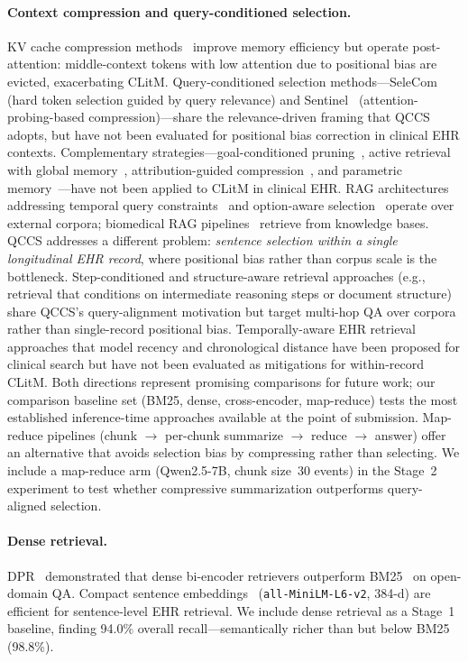 \documentclass{article}
\begin{document}
\paragraph{Context compression and query-conditioned selection.}
KV cache compression methods~\cite{zhang2023h2o,li2024snapkv,pan2024llmlingua2,%
bui2025cachewhat,zhou2024dynamickv} improve memory efficiency but operate
post-attention: middle-context tokens with low attention due to positional bias
are evicted, exacerbating CLitM. Query-conditioned selection methods---SeleCom
\cite{liu2026selecom} (hard token selection guided by query relevance) and
Sentinel~\cite{zhang2025sentinel} (attention-probing-based compression)---share
the relevance-driven framing that QCCS adopts, but have not been evaluated for
positional bias correction in clinical EHR contexts.
Complementary strategies---goal-conditioned pruning~\cite{wang2026swepruner}, active retrieval with global memory~\cite{qian2025memorag}, attribution-guided compression~\cite{gao2026aif}, and parametric memory~\cite{lu2026locas}---have not been applied to CLitM in clinical EHR.
RAG architectures addressing temporal query constraints~\cite{zhang2024mrag} and option-aware selection~\cite{singh2025oadr} operate over external corpora; biomedical RAG pipelines~\cite{stuhlmann2025biomedrag} retrieve from knowledge bases.
QCCS addresses a different problem: \emph{sentence selection within a single longitudinal EHR record}, where positional bias rather than corpus scale is the bottleneck.
Step-conditioned and structure-aware retrieval approaches (e.g., retrieval that conditions on intermediate reasoning steps or document structure) share QCCS's query-alignment motivation but target multi-hop QA over corpora rather than single-record positional bias. Temporally-aware EHR retrieval approaches that model recency and chronological distance have been proposed for clinical search but have not been evaluated as mitigations for within-record CLitM. Both directions represent promising comparisons for future work; our comparison baseline set (BM25, dense, cross-encoder, map-reduce) tests the most established inference-time approaches available at the point of submission.
Map-reduce pipelines (chunk $\to$ per-chunk summarize $\to$ reduce $\to$ answer)
offer an alternative that avoids selection bias by compressing rather than selecting.
We include a map-reduce arm (Qwen2.5-7B, chunk size~30 events) in the Stage~2
experiment to test whether compressive summarization outperforms query-aligned selection.

\paragraph{Dense retrieval.}
DPR~\cite{karpukhin2020dpr} demonstrated that dense bi-encoder retrievers
outperform BM25~\cite{robertson2009bm25} on open-domain QA.
Compact sentence embeddings~\cite{reimers2019sentence} (\texttt{all-MiniLM-L6-v2},
384-d) are efficient for sentence-level EHR retrieval. We include dense retrieval
as a Stage~1 baseline, finding 94.0\% overall recall---semantically richer than
but below BM25 (98.8\%).
\end{document}
